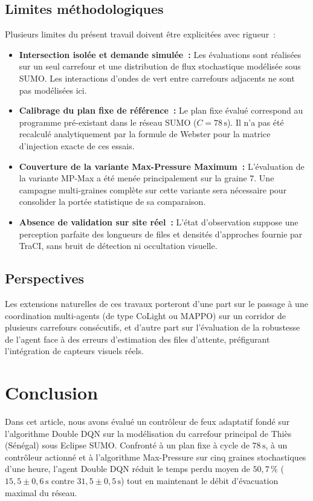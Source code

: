 \documentclass[10pt,twocolumn,letterpaper]{article}
\begin{document}
\subsection{Limites méthodologiques}
Plusieurs limites du présent travail doivent être explicitées avec rigueur~:
\begin{itemize}[nosep]
    \item \textbf{Intersection isolée et demande simulée~:} Les évaluations sont réalisées sur un seul carrefour et une distribution de flux stochastique modélisée sous SUMO. Les interactions d'ondes de vert entre carrefours adjacents ne sont pas modélisées ici.
    \item \textbf{Calibrage du plan fixe de référence~:} Le plan fixe évalué correspond au programme pré-existant dans le réseau SUMO ($C = 78\,\mathrm{s}$). Il n'a pas été recalculé analytiquement par la formule de Webster pour la matrice d'injection exacte de ces essais.
    \item \textbf{Couverture de la variante Max-Pressure Maximum~:} L'évaluation de la variante MP-Max a été menée principalement sur la graine 7. Une campagne multi-graines complète sur cette variante sera nécessaire pour consolider la portée statistique de sa comparaison.
    \item \textbf{Absence de validation sur site réel~:} L'état d'observation suppose une perception parfaite des longueurs de files et densités d'approches fournie par TraCI, sans bruit de détection ni occultation visuelle.
\end{itemize}

\subsection{Perspectives}
Les extensions naturelles de ces travaux porteront d'une part sur le passage à une coordination multi-agents (de type CoLight ou MAPPO) sur un corridor de plusieurs carrefours consécutifs, et d'autre part sur l'évaluation de la robustesse de l'agent face à des erreurs d'estimation des files d'attente, préfigurant l'intégration de capteurs visuels réels.

\section{Conclusion}
\label{sec:conclusion}

Dans cet article, nous avons évalué un contrôleur de feux adaptatif fondé sur l'algorithme Double DQN sur la modélisation du carrefour principal de Thiès (Sénégal) sous Eclipse SUMO. Confronté à un plan fixe à cycle de $78\,\mathrm{s}$, à un contrôleur actionné et à l'algorithme Max-Pressure sur cinq graines stochastiques d'une heure, l'agent Double DQN réduit le temps perdu moyen de $50{,}7\,\%$ ($15{,}5 \pm 0{,}6\,\mathrm{s}$ contre $31{,}5 \pm 0{,}5\,\mathrm{s}$) tout en maintenant le débit d'évacuation maximal du réseau.
\end{document}
